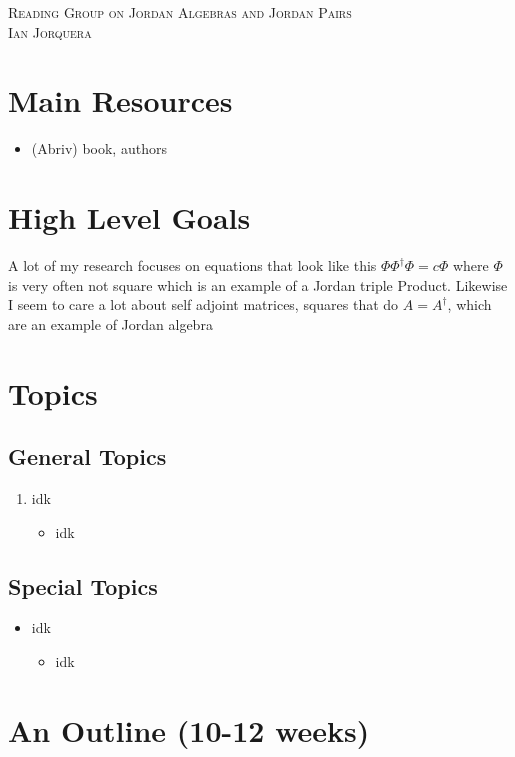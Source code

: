 \documentclass[12pt]{amsart}
\begin{document}
\begin{center}
    \textsc{Reading Group on Jordan Algebras and Jordan Pairs\\ Ian Jorquera}
\end{center}
\vspace{1em}

\section*{Main Resources}
\begin{itemize}
    \item[] (Abriv) book, authors
\end{itemize}

\section*{High Level Goals}
A lot of my research focuses on equations that look like this 
$\Phi\Phi^\dagger\Phi=c\Phi$ where $\Phi$ is very often not square
which is an example of a Jordan triple Product. Likewise I seem to care a lot 
about self adjoint matrices, squares that do $A=A^\dagger$, which are an example 
of Jordan algebra
\section*{Topics}
\subsection*{General Topics}
\begin{enumerate}
    \item idk
    \begin{itemize}
        \item idk
    \end{itemize}
\end{enumerate}

\subsection*{Special Topics}
\begin{itemize}
    \item idk 
    \begin{itemize}
        \item idk
    \end{itemize}
\end{itemize}

\section*{An Outline (10-12 weeks)}
\end{document}
